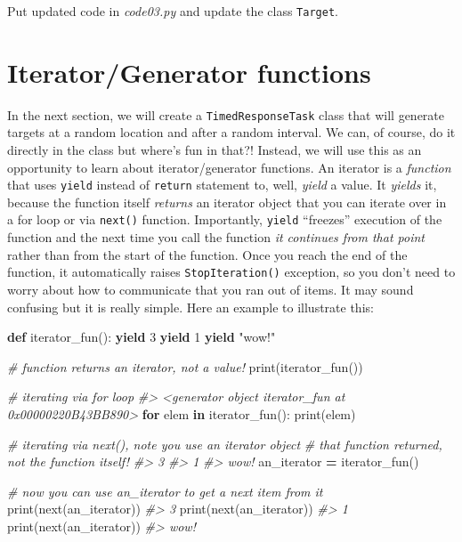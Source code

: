 \documentclass[
]{book}
\newenvironment{Shaded}{\begin{snugshade}}{\end{snugshade}}
\newcommand{\BuiltInTok}[1]{#1}
\newcommand{\CommentTok}[1]{\textcolor[rgb]{0.56,0.35,0.01}{\textit{#1}}}
\newcommand{\ControlFlowTok}[1]{\textcolor[rgb]{0.13,0.29,0.53}{\textbf{#1}}}
\newcommand{\DecValTok}[1]{\textcolor[rgb]{0.00,0.00,0.81}{#1}}
\newcommand{\KeywordTok}[1]{\textcolor[rgb]{0.13,0.29,0.53}{\textbf{#1}}}
\newcommand{\NormalTok}[1]{#1}
\newcommand{\OperatorTok}[1]{\textcolor[rgb]{0.81,0.36,0.00}{\textbf{#1}}}
\newcommand{\StringTok}[1]{\textcolor[rgb]{0.31,0.60,0.02}{#1}}
\begin{document}
Put updated code in \emph{code03.py} and update the class \texttt{Target}.

\hypertarget{iteratorgenerator-functions}{%
\section{Iterator/Generator functions}\label{iteratorgenerator-functions}}

In the next section, we will create a \texttt{TimedResponseTask} class that will generate targets at a random location and after a random interval. We can, of course, do it directly in the class but where's fun in that?! Instead, we will use this as an opportunity to learn about iterator/generator functions. An iterator is a \emph{function} that uses \texttt{yield} instead of \texttt{return} statement to, well, \emph{yield} a value. It \emph{yields} it, because the function itself \emph{returns} an iterator object that you can iterate over in a for loop or via \texttt{next()} function. Importantly, \texttt{yield} ``freezes'' execution of the function and the next time you call the function \emph{it continues from that point} rather than from the start of the function. Once you reach the end of the function, it automatically raises \texttt{StopIteration()} exception, so you don't need to worry about how to communicate that you ran out of items. It may sound confusing but it is really simple. Here an example to illustrate this:

\begin{Shaded}
\begin{Highlighting}[]
\KeywordTok{def}\NormalTok{ iterator\_fun():}
    \ControlFlowTok{yield} \DecValTok{3}
    \ControlFlowTok{yield} \DecValTok{1}
    \ControlFlowTok{yield} \StringTok{"wow!"}
  
\CommentTok{\# function returns an iterator, not a value!}
\BuiltInTok{print}\NormalTok{(iterator\_fun())}

\CommentTok{\# iterating via for loop}
\CommentTok{\#\textgreater{} \textless{}generator object iterator\_fun at 0x00000220B43BB890\textgreater{}}
\ControlFlowTok{for}\NormalTok{ elem }\KeywordTok{in}\NormalTok{ iterator\_fun():}
    \BuiltInTok{print}\NormalTok{(elem)}
    
\CommentTok{\# iterating via next(), note you use an iterator object }
\CommentTok{\# that function returned, not the function itself!}
\CommentTok{\#\textgreater{} 3}
\CommentTok{\#\textgreater{} 1}
\CommentTok{\#\textgreater{} wow!}
\NormalTok{an\_iterator }\OperatorTok{=}\NormalTok{ iterator\_fun()  }

\CommentTok{\# now you can use an\_iterator to get a next item from it}
\BuiltInTok{print}\NormalTok{(}\BuiltInTok{next}\NormalTok{(an\_iterator))}
\CommentTok{\#\textgreater{} 3}
\BuiltInTok{print}\NormalTok{(}\BuiltInTok{next}\NormalTok{(an\_iterator))}
\CommentTok{\#\textgreater{} 1}
\BuiltInTok{print}\NormalTok{(}\BuiltInTok{next}\NormalTok{(an\_iterator))}
\CommentTok{\#\textgreater{} wow!}
\end{Highlighting}
\end{Shaded}
\end{document}
